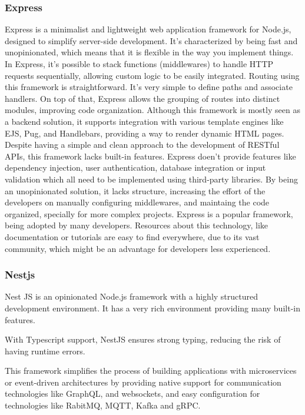 \subsubsection{Express}
Express is a minimalist and lightweight web application framework for Node.js,
designed to simplify server-side development. It's characterized by being
fast and unopinionated, which means that it is flexible in the way you implement
things.
In Express, it's possible to stack functions (middlewares) to handle \gls{HTTP}
requests sequentially, allowing custom logic to be easily integrated.
Routing using this framework is straightforward. It's very simple to define
paths and associate handlers. On top of that, Express allows the grouping of
routes into distinct modules, improving code organization.
Although this framework is mostly seen as a backend solution, it supports
integration with various template engines like EJS, Pug, and Handlebars,
providing a way to render dynamic HTML pages.
Despite having a simple and clean approach to the development of RESTful APIs,
this framework lacks built-in features. Express doen't provide features like
dependency injection, user authentication, database integration or input
validation which all need to be implemented using third-party libraries.
By being an unopinionated solution, it lacks structure, increasing the effort
of the developers on manually configuring middlewares, and maintaing the code
organized, specially for more complex projects.
Express is a popular framework, being adopted by many developers. Resources
about this technology, like documentation or tutorials are easy to find
everywhere, due to its vast community, which might be an advantage for
developers less experienced.

\subsubsection{Nestjs}
Nest JS is an opinionated Node.js framework with a highly structured
development environment. It has a very rich environment providing many built-in
features.

With Typescript support, NestJS ensures strong typing, reducing the risk of
having runtime errors.

This framework simplifies the process of building applications with
microservices or event-driven architectures by providing native support for
communication technologies like GraphQL, and websockets, and easy configuration
for technologies like RabitMQ, MQTT, Kafka and \gls{gRPC}.

